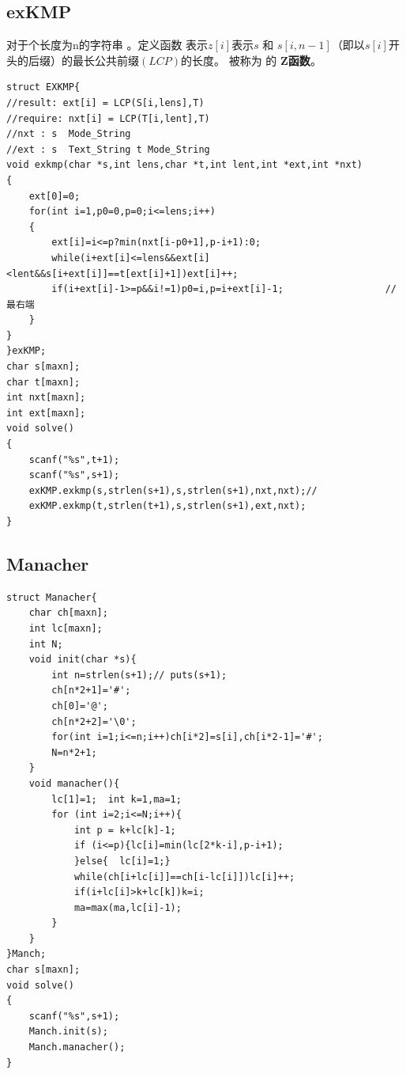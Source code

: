 \documentclass[12pt, a4paper, oneside]{ctexart}
\begin{document}
\newpage
\subsection{exKMP  } 
对于个长度为n的字符串 。定义函数 表示$z[i]$表示$s$ 和 $s[i,n-1]$（即以$s[i]$开头的后缀）的最长公共前缀$(LCP)$的长度。 被称为 的  \textbf{Z函数}。
\begin{lstlisting}
struct EXKMP{
//result: ext[i] = LCP(S[i,lens],T)
//require: nxt[i] = LCP(T[i,lent],T)
//nxt : s  Mode_String
//ext : s  Text_String t Mode_String
void exkmp(char *s,int lens,char *t,int lent,int *ext,int *nxt)
{
    ext[0]=0;
    for(int i=1,p0=0,p=0;i<=lens;i++)
    {
        ext[i]=i<=p?min(nxt[i-p0+1],p-i+1):0;
        while(i+ext[i]<=lens&&ext[i]<lent&&s[i+ext[i]]==t[ext[i]+1])ext[i]++;
        if(i+ext[i]-1>=p&&i!=1)p0=i,p=i+ext[i]-1;                  //最右端
    }
}
}exKMP;
char s[maxn];
char t[maxn];
int nxt[maxn];
int ext[maxn];
void solve()
{ 
	scanf("%s",t+1);
	scanf("%s",s+1);
	exKMP.exkmp(s,strlen(s+1),s,strlen(s+1),nxt,nxt);//
	exKMP.exkmp(t,strlen(t+1),s,strlen(s+1),ext,nxt);  
}
\end{lstlisting}




\newpage
\subsection{Manacher} 
\begin{lstlisting}
struct Manacher{
	char ch[maxn];
	int lc[maxn];
	int N;
	void init(char *s){
		int n=strlen(s+1);// puts(s+1);
		ch[n*2+1]='#';
		ch[0]='@';
		ch[n*2+2]='\0';
		for(int i=1;i<=n;i++)ch[i*2]=s[i],ch[i*2-1]='#';
		N=n*2+1;
	}
	void manacher(){
		lc[1]=1;  int k=1,ma=1;
		for (int i=2;i<=N;i++){
			int p = k+lc[k]-1;
			if (i<=p){lc[i]=min(lc[2*k-i],p-i+1);
			}else{	lc[i]=1;}
			while(ch[i+lc[i]]==ch[i-lc[i]])lc[i]++;
			if(i+lc[i]>k+lc[k])k=i;
			ma=max(ma,lc[i]-1);
		}
	}
}Manch;
char s[maxn];
void solve()
{
	scanf("%s",s+1);
	Manch.init(s);
	Manch.manacher();
}

\end{lstlisting}



\newpage
\end{document}
